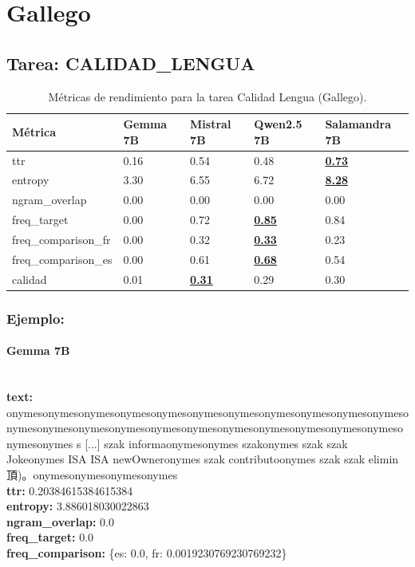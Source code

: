 \section{Gallego}

\subsection{Tarea: CALIDAD\_LENGUA}\label{tarea-calidad_lengua}
\begin{longtable}[]{@{}lllll@{}}
\toprule\noalign{}
Métrica & Gemma 7B & Mistral 7B & Qwen2.5 7B & Salamandra 7B \\
\midrule\noalign{}
\endhead
\bottomrule\noalign{}
\caption{Métricas de rendimiento para la tarea Calidad Lengua (Gallego).}
\label{tab:metricas_calidad_lengua_Gallego}
\endlastfoot
ttr & 0.16 & 0.54 & 0.48 & \textbf{\underline{0.73}} \\
entropy & 3.30 & 6.55 & 6.72 & \textbf{\underline{8.28}} \\
ngram\_overlap & 0.00 & 0.00 & 0.00 & 0.00 \\
freq\_target & 0.00 & 0.72 & \textbf{\underline{0.85}} & 0.84 \\
freq\_comparison\_fr & 0.00 & 0.32 & \textbf{\underline{0.33}} & 0.23 \\
freq\_comparison\_es & 0.00 & 0.61 & \textbf{\underline{0.68}} & 0.54 \\
calidad & 0.01 & \textbf{\underline{0.31}} & 0.29 & 0.30 \\
\end{longtable}

\subsubsection{Ejemplo:}

\paragraph{Gemma 7B}~\\
\textbf{text:} onymesonymesonymesonymesonymesonymesonymesonymesonymesonymesonymesonymesonymesonymesonymesonymesonymesonymesonymesonymesonymesonymesonymesonymes s [...] szak informaonymesonymes szakonymes szak szak Jokeonymes ISA ISA newOwneronymes szak contributoonymes szak szak elimin 頂)。onymesonymesonymesonymes\\
\textbf{ttr:} 0.20384615384615384\\
\textbf{entropy:} 3.886018030022863\\
\textbf{ngram\_overlap:} 0.0\\
\textbf{freq\_target:} 0.0\\
\textbf{freq\_comparison:} \{\textquotesingle{}es\textquotesingle{}: 0.0, \textquotesingle{}fr\textquotesingle{}: 0.0019230769230769232\}

